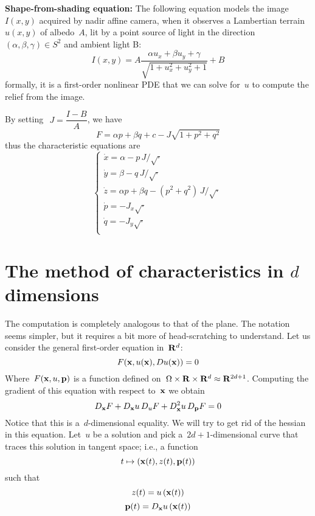 {\bf Shape-from-shading equation:}
The following equation models the image~$I(x,y)$ acquired by nadir affine
camera, when it observes a Lambertian terrain~$u(x,y)$ of albedo~$A$, lit by
a point source of light in the direction~$\left(\alpha,\beta,\gamma\right)\in
S^2$ and ambient light B:
\[
	I(x,y)=A\frac{\alpha u_x+\beta u_y+\gamma}{\sqrt{1+u_x^2+u_y^2+1}}+B
\]
formally, it is a first-order nonlinear PDE that we can solve for~$u$ to
compute the relief from the image.

By setting~$ \ J=\dfrac{I-B}A$, we have
\[
	F = \alpha p + \beta q + c - J\sqrt{1+p^2+q^2}
\]
thus the characteristic equations are
\[
	\begin{cases}
		\dot x = \alpha - p\,J/\sqrt{\cdot} \\
		\dot y = \beta - q\,J/\sqrt{\cdot} \\
		\dot z = \alpha p + \beta q - (p^2+q^2)\,J/\sqrt{\cdot}\\
		\dot p = -J_x\sqrt{\cdot} \\
		\dot q = -J_y\sqrt{\cdot} \\
	\end{cases}
\]


\clearpage
\section{The method of characteristics in $d$ dimensions}

The computation is completely analogous to that of the plane.  The notation
seems simpler, but it requires a bit more of head-scratching to understand.
Let us consider the general first-order equation in~$\mathbf{R}^d$:
\begin{equation}\label{eq:pdedd}
	F(\mathbf{x}, u(\mathbf{x}), Du(\mathbf{x})) = 0
\end{equation}
Where~$F(\mathbf{x},u,\mathbf{p})$ is a function defined
on~$\Omega\times\mathbf{R}\times\mathbf{R}^d\approx\mathbf{R}^{2d+1}$.  Computing the gradient of
this equation with respect to~$\mathbf{x}$ we obtain
\begin{equation}\label{eq:gradpdedd}
	D_{\mathbf{x}}F + D_{\mathbf{x}}u\,D_uF + D^2_{\mathbf{x}}u\,D_{\mathbf{p}}F = 0
\end{equation}
Notice that this is a~$d$-dimensional equality.  We will try to get rid of
the hessian in this equation.  Let~$u$ be a solution and pick
a~$2d+1$-dimensional curve that traces this solution in tangent space; i.e.,
a function
\begin{equation*}
	t\mapsto\left(
		\mathbf{x}(t),z(t),\mathbf{p}(t)
	\right)
\end{equation*}
such that
\begin{equation}
	z(t)=u\left(\mathbf{x}(t)\right)
\end{equation}
\begin{equation}
	\mathbf{p}(t)=D_{\mathbf{x}}u\left(\mathbf{x}(t)\right)
\end{equation}

